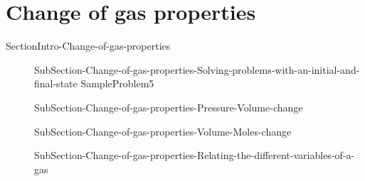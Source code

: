 \documentclass[main.tex]{subfiles}
\newcommand\chapterlabel{Ch-Gas}\setcounter{figurenewcounter}{0}\setcounter{tablenewcounter}{0}\setcounter{formulanewcounter}{0}
\begin{document}
 \section{Change of gas properties}{SectionIntro-Change-of-gas-properties}
\sloppy \begin{description}
\item[]  {SubSection-Change-of-gas-properties-Solving-problems-with-an-initial-and-final-state}
{SampleProblem5}
\item[] {SubSection-Change-of-gas-properties-Pressure-Volume-change}
 \item[] {SubSection-Change-of-gas-properties-Volume-Moles-change}
\item[]  {SubSection-Change-of-gas-properties-Relating-the-different-variables-of-a-gas}
\end{description}










 
\end{document}
